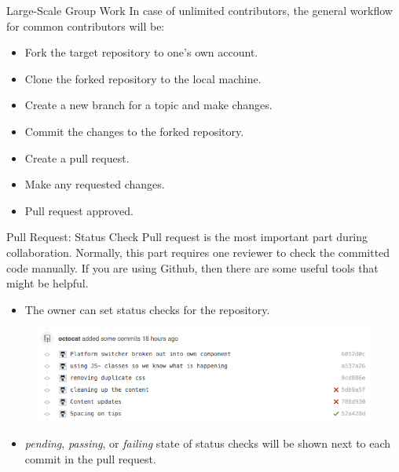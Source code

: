 \documentclass[12pt]{beamer}
\begin{document}
\begin{frame}{Large-Scale Group Work}
    In case of unlimited contributors, the general workflow for common contributors will be:
    \begin{itemize}
        \item Fork the target repository to one's own account.
        \item Clone the forked repository to the local machine.
        \item Create a new branch for a topic and make changes.
        \item Commit the changes to the forked repository.
        \item Create a pull request.
        \item Make any requested changes.
        \item Pull request approved.
    \end{itemize}
\end{frame}
\begin{frame}{Pull Request: Status Check}
    Pull request is the most important part during collaboration. Normally, this part requires one reviewer to check the committed code manually. If you are using Github, then there are some useful tools that might be helpful.
    \begin{itemize}
        \item The owner can set status checks for the repository.
    \end{itemize}
    \begin{figure}
        \centering
        \includegraphics[width=0.8\linewidth]{commit-list-statuses.png}
        \label{fig:commit-list-statuses}
    \end{figure}
    \begin{itemize}
        \item \textit{pending}, \textit{passing}, or \textit{failing} state of status checks will be shown next to each commit in the pull request.
    \end{itemize}
\end{frame}
\end{document}
